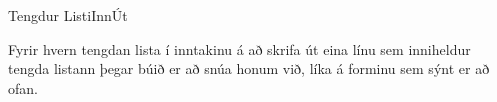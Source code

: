 \begin{problem}{Tengdur Listi}{Inn}{Út}{~}{~}
	\Output

		Fyrir hvern tengdan lista í inntakinu á að skrifa út eina línu sem inniheldur tengda listann þegar búið er að snúa honum við, líka á forminu sem sýnt er að ofan.

	\Examples

		\begin{example}
		\end{example}

\end{problem}